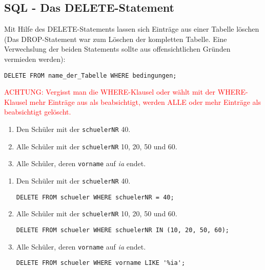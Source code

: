 \subsection[DELETE-Statement]{SQL - Das DELETE-Statement}\label{delete}
Mit Hilfe des DELETE-Statements lassen sich Einträge aus einer Tabelle löschen (Das DROP-Statement war zum Löschen der kompletten Tabelle. Eine Verwechslung der beiden Statements sollte aus offensichtlichen Gründen vermieden werden):
\begin{tcolorbox}[title=DELETE-Statement]
	\lstinline!DELETE FROM name_der_Tabelle WHERE bedingungen;!
\end{tcolorbox}
\textcolor{red}{ACHTUNG: Vergisst man die WHERE-Klausel oder wählt mit der WHERE-Klausel mehr Einträge aus als beabsichtigt, werden ALLE oder mehr Einträge als beabsichtigt gelöscht.}

\begin{Exercise}[title={Lösche folgende Einträge aus der Datenbank:}, label=Delete]
	\begin{enumerate}
		\item Den Schüler mit der \lstinline!schuelerNR! 40.
		\item Alle Schüler mit der \lstinline!schuelerNR! 10, 20, 50 und 60.
		\item Alle Schüler, deren \lstinline!vorname! auf \textit{ia} endet.
	\end{enumerate}
\end{Exercise}
\begin{Answer}[ref=Delete]
	\begin{enumerate}
		\item Den Schüler mit der \lstinline!schuelerNR! 40.

		\lstinline!DELETE FROM schueler WHERE schuelerNR = 40;!
		\item Alle Schüler mit der \lstinline!schuelerNR! 10, 20, 50 und 60.

		\lstinline!DELETE FROM schueler WHERE schuelerNR IN (10, 20, 50, 60);!
		\item Alle Schüler, deren \lstinline!vorname! auf \textit{ia} endet.

		\lstinline!DELETE FROM schueler WHERE vorname LIKE '%ia';!
	\end{enumerate}
\end{Answer}